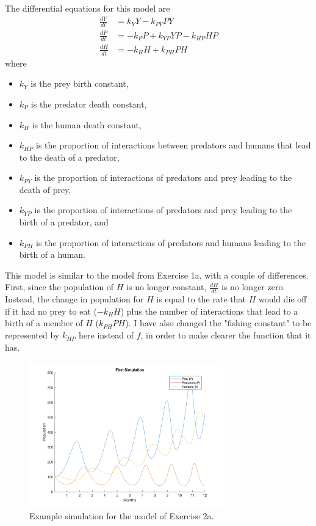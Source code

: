 \documentclass[12pt]{article}
\begin{document}
\begin{enumerate}
\begin{enumerate}
  			The differential equations for this model are
  			\begin{align}
  				\frac{dY}{dt} &= k_{Y}Y - k_{PY}PY\\
  				\frac{dP}{dt} &= -k_{P}P + k_{YP}YP - k_{HP}HP\\
  				\frac{dH}{dt} &= -k_{H}H + k_{PH}PH
  			\end{align}
  			where
  			\begin{itemize}
  				\item $k_{Y}$ is the prey birth constant,
  				\item $k_{P}$ is the predator death constant,
  				\item $k_{H}$ is the human death constant,
  				\item $k_{HP}$ is the proportion of interactions between predators and humans that lead to the death of a predator,
  				\item $k_{PY}$ is the proportion of interactions of predators and prey leading to the death of prey,
  				\item $k_{YP}$ is the proportion of interactions of predators and prey leading to the birth of a predator, and
  				\item $k_{PH}$ is the proportion of interactions of predators and humans leading to the birth of a human.
  			\end{itemize}
  			
  			This model is similar to the model from Exercise 1a, with a couple of differences. First, since the population of $H$ is no longer constant, $\frac{dH}{dt}$ is no longer zero. Instead, the change in population for $H$ is equal to the rate that $H$ would die off if it had no prey to eat ($-k_{H}H$) plus the number of interactions that lead to a birth of a member of $H$ ($k_{PH}PH$). I have also changed the "fishing constant" to be represented by $k_{HP}$ here instead of $f$, in order to make clearer the function that it has.
  			
  			\begin{figure}[h]
    			\includegraphics[width=0.75\textwidth]{2a-1}
    			\centering
          \caption{Example simulation for the model of Exercise 2a.}
          \label{fig:2a-1}
        \end{figure}
        

\end{enumerate}
\end{enumerate}
\end{document}
